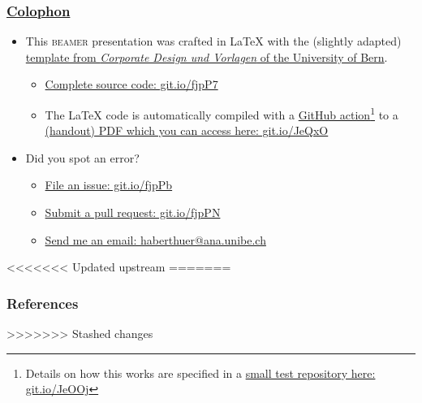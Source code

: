 \begin{frame}
\begin{frame}
	\frametitle{\href{https://en.wikipedia.org/wiki/Colophon_(publishing)}{Colophon}}
	\begin{itemize}
		\item This \textsc{beamer} presentation was crafted in \LaTeX\xspace with the (slightly adapted) \href{http://intern.unibe.ch/dienstleistungen/corporate_design_und_vorlagen/praesentationen/index_ger.html}{template from \emph{Corporate Design und Vorlagen} of the University of Bern}.
		\begin{itemize}
			\item \href{https://github.com/habi/lecture.microtomography/}{Complete source code: git.io/fjpP7}
			\item The \LaTeX\xspace code is automatically compiled with a \href{https://github.com/actions}{GitHub action}\footnote{Details on how this works are specified in a \href{https://github.com/habi/latex-test/}{small test repository here: git.io/JeOOj}} to a \href{https://habi.github.io/Lecture.Microtomography/XRayMicroTomography.Handout.pdf}{(handout) PDF which you can access here: git.io/JeQxO}
		\end{itemize}
		\item Did you spot an error?
		\begin{itemize}
			\item \href{https://github.com/habi/lecture.microtomography/issues}{File an issue: git.io/fjpPb}
			\item \href{https://github.com/habi/lecture.microtomography/pulls}{Submit a pull request: git.io/fjpPN}
			\item \href{mailto:haberthuer@ana.unibe.ch?subject=Error\%20in\%20the\%20(micro)-tomography\%20lecture\&body=https://xkcd.com/386/}{Send me an email: haberthuer@ana.unibe.ch}
		\end{itemize}
	\end{itemize}
\end{frame}

<<<<<<< Updated upstream
=======
	\frametitle{References}
	\printbibliography
\end{frame}

>>>>>>> Stashed changes

